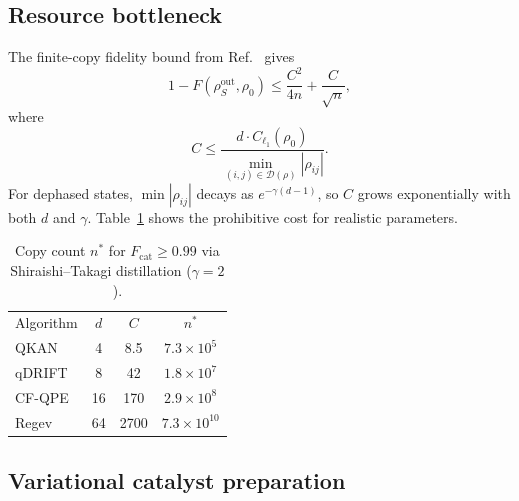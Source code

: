\documentclass[pra,twocolumn,superscriptaddress,longbibliography,floatfix]{revtex4-2}
\begin{document}
\subsection{Resource bottleneck}
\label{sec:bottleneck}

The finite-copy fidelity bound from Ref.~\cite{Shiraishi2024} gives
\begin{equation}
1 - F(\rho_S^\mathrm{out}, \rho_0) \leq \frac{C^2}{4n} + \frac{C}{\sqrt{n}},
\label{eq:finite_n_fidelity}
\end{equation}
where
\begin{equation}
C \leq \frac{d \cdot C_{\ell_1}(\rho_0)}{\displaystyle\min_{(i,j) \in \mathcal{D}(\rho)} |\rho_{ij}|}.
\label{eq:C_bound}
\end{equation}
For dephased states, $\min|\rho_{ij}|$ decays as $e^{-\gamma(d-1)}$, so $C$ grows exponentially with both $d$ and $\gamma$.
Table~\ref{tab:bottleneck} shows the prohibitive cost for realistic parameters.

\begin{table}[tb]
\caption{Copy count $n^*$ for $F_\mathrm{cat} \geq 0.99$ via Shiraishi--Takagi distillation ($\gamma = 2$).}
\label{tab:bottleneck}
\centering\footnotesize
\setlength{\tabcolsep}{3pt}
\begin{ruledtabular}
\begin{tabular}{lccc}
Algorithm & $d$ & $C$ & $n^*$ \\
\colrule
QKAN & 4 & 8.5 & $7.3 \times 10^5$ \\
qDRIFT & 8 & 42 & $1.8 \times 10^7$ \\
CF-QPE & 16 & 170 & $2.9 \times 10^8$ \\
Regev & 64 & 2700 & $7.3 \times 10^{10}$ \\
\end{tabular}
\end{ruledtabular}
\end{table}


\subsection{Variational catalyst preparation}
\label{sec:variational}
\end{document}
